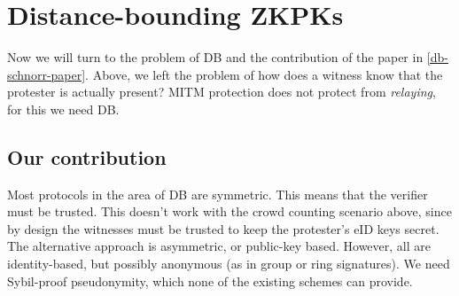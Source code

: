 
\section[\acs*{DB} \acsp*{ZKPK}]{Distance-bounding \aclp*{ZKPK}}

Now we will turn to the problem of \ac{DB} and the contribution of the paper in 
\cref{db-schnorr-paper}.
Above, we left the problem of how does a witness know that the protester is 
actually present?
\Ac{MITM} protection does not protect from \emph{relaying}, for this we need 
\ac{DB}.

\subsection{Our contribution}

Most protocols in the area of \acl{DB} are symmetric.
This means that the verifier must be trusted.
This doesn't work with the crowd counting scenario above, since by design the 
witnesses must be trusted to keep the protester's \ac{eID} keys secret.
The alternative approach is asymmetric, or public-key based.
However, all are identity-based, but possibly anonymous (as in group or ring 
signatures).
We need Sybil-proof pseudonymity, which none of the existing schemes can 
provide.

